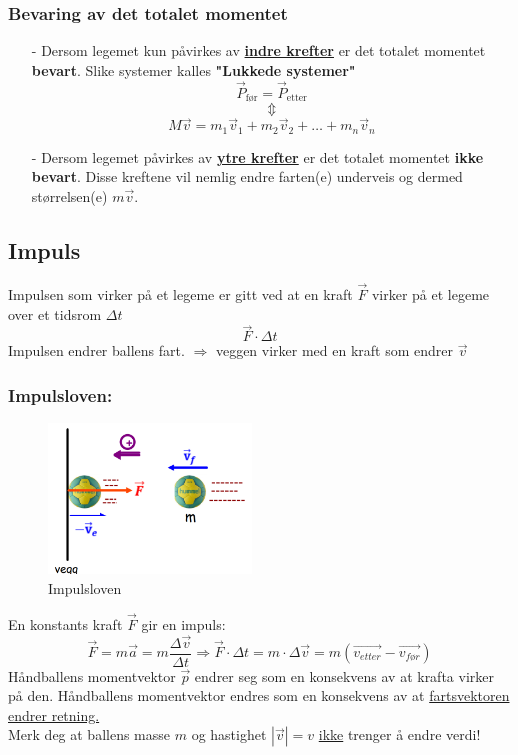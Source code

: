 \documentclass[12pt]{article}
\begin{document}
\subsubsection{Bevaring av det totalet momentet}
\begin{itemize}
    \item[-] Dersom legemet kun påvirkes av \underline{\textbf{indre krefter}} er det totalet momentet \textbf{bevart}. Slike systemer kalles \textbf{"Lukkede systemer"}
    $$\Vec{P}_{\text{før}} = \Vec{P}_{\text{etter}} $$
    $$\Updownarrow$$
    $$M\Vec{v} = m_1\Vec{v}_1 + m_2\Vec{v}_2 + \dots + m_n\Vec{v}_n$$
    \item[-] Dersom legemet påvirkes av \underline{\textbf{ytre krefter}} er det totalet momentet \textbf{ikke bevart}. Disse kreftene vil nemlig  endre farten(e) underveis og dermed størrelsen(e) $m\Vec{v}$.
\end{itemize}

\pagebreak
\subsection{Impuls}
Impulsen som virker på et legeme er gitt ved at en kraft $\Vec{F}$ virker på et legeme over et tidsrom $\Delta t$
$$\Vec{F}\cdot \Delta t$$
Impulsen endrer ballens fart. $\Rightarrow$ veggen virker med en kraft som endrer $\Vec{v}$

\subsubsection{\textbf{Impulsloven:}}
\begin{figure} [H]
    \centering
    \includegraphics[height=4cm]{images/impuls.png}
    \caption{Impulsloven}
\end{figure}
En konstants kraft $\Vec{F}$ gir en impuls:
$$\Vec{F} = m\Vec{a} = m\frac{\Delta\Vec{v}}{\Delta t} \Rightarrow \Vec{F}\cdot\Delta t = m\cdot\Delta\Vec{v} = m(\Vec{v_{etter}} - \Vec{v_{før}})$$
Håndballens momentvektor $\Vec{p}$ endrer seg som en konsekvens av at krafta virker på den.
Håndballens momentvektor endres som en konsekvens av at \underline{fartsvektoren endrer retning.}\\
\bigskip
\color{blue}
Merk deg at ballens masse $m$ og hastighet $|\Vec{v}| = v$ \underline{ikke} trenger å endre verdi!
\color{black}
\pagebreak
\end{document}
